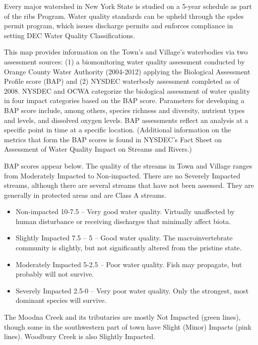 Every major watershed in New York State is studied on a 5-year schedule as part 
of the \gls{ribs} Program. Water quality standards can be upheld through the 
\gls{spdes} permit program, which issues discharge permits and enforces 
compliance in setting DEC Water Quality Classifications.

This map provides information on the Town's and Village's waterbodies via two 
assessment sources: (1) a biomonitoring water quality assessment conducted by 
Orange County Water Authority (2004-2012) applying the Biological Assessment 
Profile score (BAP) and (2) NYSDEC waterbody assessment completed as of 2008.  
NYSDEC and OCWA categorize the biological assessment of water quality in four 
impact categories based on the BAP score. Parameters for developing a BAP score 
include, among others, species richness and diversity, nutrient types and 
levels, and dissolved oxygen levels. BAP assessments reflect an analysis at a 
specific point in time at a specific location. (Additional information on the 
metrics that form the BAP scores is found in NYSDEC's Fact Sheet on Assessment 
of Water Quality Impact on Streams and Rivers.) 

BAP scores appear below. The quality of the streams in Town and Village ranges 
from Moderately Impacted to Non-impacted. There are no Severely Impacted 
streams, although there are several streams that have not been assessed. They 
are generally in protected areas and are Class A streams.
\begin{itemize}
    \item Non-impacted 10-7.5 – Very good water quality. Virtually unaffected 
    by human disturbance or receiving discharges that minimally affect 
    biota.
    \item Slightly Impacted 7.5 – 5 – Good water quality. The 
    macroinvertebrate community is slightly, but not significantly altered from 
    the pristine state.
    \item Moderately Impacted 5-2.5 – Poor water quality. Fish may propagate, 
    but probably will not survive.
    \item Severely Impacted 2.5-0 – Very poor water quality. Only the 
    strongest, most dominant species will survive.
\end{itemize}

The Moodna Creek and its tributaries are mostly Not Impacted (green lines), 
though some in the southwestern part of town have Slight (Minor) Impacts (pink 
lines). Woodbury Creek is also Slightly Impacted.

\label{map:biomonitoringandprioritywaterbodies}
